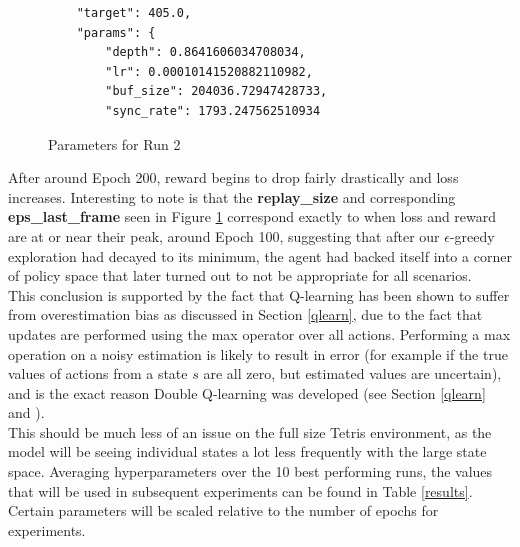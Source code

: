 \documentclass[12pt]{article}
\begin{document}
\begin{figure}[H]
    \centering
    \begin{lstlisting}
    "target": 405.0,
    "params": {
        "depth": 0.8641606034708034,
        "lr": 0.00010141520882110982,
        "buf_size": 204036.72947428733,
        "sync_rate": 1793.247562510934        
    \end{lstlisting}
    \caption{Parameters for Run 2}
    \label{run2}
\end{figure}
After around Epoch 200, reward begins to drop fairly drastically and loss increases. Interesting to note is that the \textbf{replay\_size} and corresponding \textbf{eps\_last\_frame} seen in Figure \ref{run2} correspond exactly to when loss and reward are at or near their peak, around Epoch 100, suggesting that after our $\epsilon$-greedy exploration had decayed to its minimum, the agent had backed itself into a corner of policy space that later turned out to not be appropriate for all scenarios. \\\newline
This conclusion is supported by the fact that Q-learning has been shown to suffer from overestimation bias as discussed in Section \ref{qlearn}, due to the fact that updates are performed using the max operator over all actions. Performing a max operation on a noisy estimation is likely to result in error (for example if the true values of actions from a state $s$ are all zero, but estimated values are uncertain), and is the exact reason Double Q-learning was developed (see Section \ref{qlearn} and \textcite{NIPS2010_091d584f}). \\\newline
This should be much less of an issue on the full size Tetris environment, as the model will be seeing individual states a lot less frequently with the large state space.
Averaging hyperparameters over the 10 best performing runs, the values that will be used in subsequent experiments can be found in Table \ref{results}. Certain parameters will be scaled relative to the number of epochs for experiments. 
\end{document}
